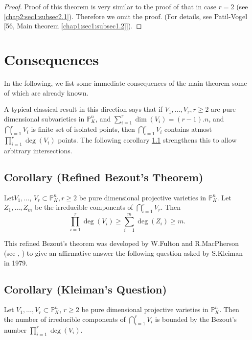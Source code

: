 \begin{proof}%
  Proof of this theorem is very similar to the proof of that in case
  $r=2$ (see \ref{chap2:sec1:subsec2.1}). Therefore we omit the proof. (For details, see
  Patil-Vogel [56, Main theorem \ref{chap1:sec1:subsec1.2}]). 
\end{proof}

\section{Consequences}\label{chap2:sec6}%

In the following, we list some immediate consequences of the main
theorem some of which are already known. 

A typical classical result in this direction says that if
$V_1,\ldots,V_r, r\geq 2$ are pure dimensional subvarieties in
$\mathbb{P}^n_{K}$, and $\sum\limits_{i=1}^{r}\dim (V_i)= (r-1).n$,
and $\bigcap\limits_{i=1}^r V_i$ is finite set of isolated points,
then $\bigcap\limits_{i=1}^r V_i$ contains atmost
$\prod\limits_{i=1}^r \deg (V_i)$ points. The following corollary
\ref{chap2:sec6:subsec2.26} strengthens this to allow arbitrary intersections. 

\setcounter{subsection}{25}
\subsection{Corollary (Refined Bezout's Theorem)}\label{chap2:sec6:subsec2.26}

Let\pageoriginale $V_1,\ldots$, $V_r \subset \mathbb{P}^n_K, r\geq 2$ be pure
  dimensional projective varieties in $\mathbb{P}^n_K$. Let
$Z_1,\ldots,Z_m$ be the irreducible components of
$\bigcap\limits_{i=1}^r V_r$. Then 
$$
\prod_{i=1}^{r} \deg (V_i)\geq \sum_{i=1}^m \deg (Z_i) \geq m.
$$

This refined Bezout's theorem was developed by W.Fulton and\break 
R.MacPherson (see \cite{19}, \cite{18}) to give an affirmative answer the
following question asked by S.Kleiman in 1979. 

\setcounter{subsection}{26}
\subsection{Corollary (Kleiman's Question)}
\label{chap2:sec6:subsec2.27}%

Let $V_1,\ldots,V_r \subset \mathbb{P}^n_K$, $r \geq 2$ be pure
  dimensional projective varieties in  $\mathbb{P}^n_K$. Then the
  number of irreducible components of  $\bigcap\limits_{i=1}^r V_i$
is bounded by the Bezout's number $\prod\limits_{i=1}^r \deg
(V_i)$. 

